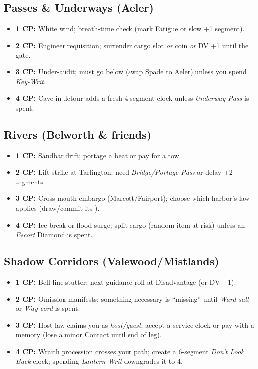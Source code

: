 \subsection{Passes \& Underways (Aeler)}
\begin{itemize}
  \item \textbf{1 CP:} White wind; breath-time check (mark Fatigue or slow +1 segment).
  \item \textbf{2 CP:} Engineer requisition; surrender cargo slot \emph{or} coin \emph{or} DV +1 until the gate.
  \item \textbf{3 CP:} Under-audit; must go below (swap Spade to Aeler) unless you spend \emph{Key-Writ}.
  \item \textbf{4 CP:} Cave-in detour adds a fresh 4-segment clock unless \emph{Underway Pass} is spent.
\end{itemize}

\subsection{Rivers (Belworth \& friends)}
\begin{itemize}
  \item \textbf{1 CP:} Sandbar drift; portage a beat or pay for a tow.
  \item \textbf{2 CP:} Lift strike at Tarlington; need \emph{Bridge/Portage Pass} or delay +2 segments.
  \item \textbf{3 CP:} Cross-mouth embargo (Marcott/Fairport); choose which harbor's law applies (draw/commit its \SuitDiamond{}).
  \item \textbf{4 CP:} Ice-break or flood surge; split cargo (random item at risk) unless an \emph{Escort} Diamond is spent.
\end{itemize}

\subsection{Shadow Corridors (Valewood/Mistlands)}
\begin{itemize}
  \item \textbf{1 CP:} Bell-line stutter; next guidance roll at Disadvantage (or DV +1).
  \item \textbf{2 CP:} Omission manifests; something necessary is ``missing'' until \emph{Ward-salt} or \emph{Way-cord} is spent.
  \item \textbf{3 CP:} Host-law claims you as \emph{host/guest}; accept a service clock or pay with a memory (lose a minor Contact until end of leg).
  \item \textbf{4 CP:} Wraith procession crosses your path; create a 6-segment \emph{Don't Look Back} clock; spending \emph{Lantern Writ} downgrades it to 4.
\end{itemize}

